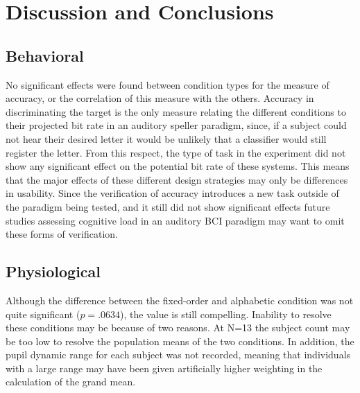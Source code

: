 \documentclass[10pt]{article}
\begin{document}
\section{Discussion and Conclusions}

\subsection{Behavioral}
No significant effects were found between condition types for the
measure of accuracy, or the correlation of this measure with the
others.  Accuracy in discriminating the target is the only measure
relating the different conditions to their projected bit rate in an
auditory speller paradigm, since, if a subject could not hear their desired
letter it would be unlikely that a classifier would still
register the letter. From this respect, the type of task in the
experiment did not show any significant effect on the potential bit rate of
these systems. This means that the major effects of these different
design strategies may only be differences in usability. Since the
verification of accuracy introduces a new task outside of the
paradigm being tested, and it still did not show significant effects
future studies assessing cognitive load in an auditory BCI paradigm
may want to omit these forms of verification.

\subsection{Physiological}
Although the difference between the fixed-order and alphabetic
condition was not quite significant ($p=.0634$), the value is
still compelling.  Inability to resolve these conditions may be
because of two reasons.  At N=13 the subject count may be too low to
resolve the population means of the two conditions. In addition, the
pupil dynamic range for each subject was not recorded, meaning that
individuals with a large range may have been given artificially higher
weighting in the calculation of the grand mean.
\end{document}
